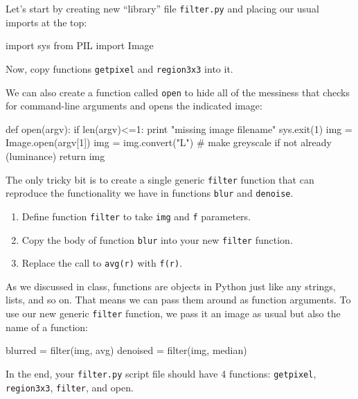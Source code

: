 Let's start by creating new ``library'' file {\tt filter.py} and placing our usual imports at the top:

\begin{pyverbatim}
import sys
from PIL import Image
\end{pyverbatim}

\noindent Now, copy functions {\tt getpixel} and {\tt region3x3} into it.

We can also create a function called {\tt open} to hide all of the messiness that checks for command-line arguments and opens the indicated image:

\begin{pyverbatim}
def open(argv):
	if len(argv)<=1:
		print "missing image filename"
		sys.exit(1)
	img = Image.open(argv[1])
	img = img.convert("L")  # make greyscale if not already (luminance)
	return img
\end{pyverbatim}

The only tricky bit is to create a single generic {\tt filter} function that can reproduce the functionality we have in functions {\tt blur} and {\tt denoise}.

\begin{enumerate}
\item Define function {\tt filter} to take {\tt img} and {\tt f} parameters.
\item Copy the body of function {\tt blur} into your new {\tt filter} function.
\item Replace the call to {\tt avg(r)} with {\tt f(r)}.
\end{enumerate}

As we discussed in class, functions are objects in Python just like any strings, lists, and so on. That means we can pass them around as function arguments. To use our new generic {\tt filter} function, we pass it an image as usual but also the name of a function:

\begin{pyverbatim}
blurred  = filter(img, avg)
denoised = filter(img, median)
\end{pyverbatim}

In the end, your {\tt filter.py} script file should have 4 functions: {\tt getpixel}, {\tt region3x3}, {\tt filter}, and {open}.

